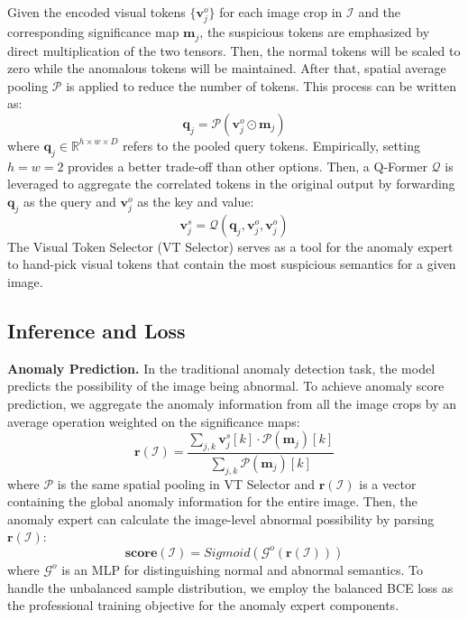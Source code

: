 Given the encoded visual tokens $\{\mathbf{v}^{o}_j\}$ for each image crop in $\mathcal{I}$ and the corresponding significance map $\textbf{m}_{j}$, the suspicious tokens are emphasized by direct multiplication of the two tensors. Then, the normal tokens will be scaled to zero while the anomalous tokens will be maintained. After that, spatial average pooling $\mathcal{P}$ is applied to reduce the number of tokens. This process can be written as:
\begin{equation}
    \textbf{q}_{j}=\mathcal{P}(\mathbf{v}^{o}_{j}\odot \textbf{m}_{j})
\end{equation}
where $\textbf{q}_{j}\in \mathbb{R}^{h \times w \times D}$ refers to the pooled query tokens. Empirically, setting $h=w=2$ provides a better trade-off than other options. Then, a Q-Former $\mathcal{Q}$ \cite{blip2} is leveraged to aggregate the correlated tokens in the original output by forwarding $\textbf{q}_{j}$ as the query and $\mathbf{v}^{o}_{j}$ as the key and value:
\begin{equation}
    \mathbf{v}^{s}_{j}=\mathcal{Q}(\textbf{q}_{j}, \mathbf{v}^{o}_{j}, \mathbf{v}^{o}_{j})
\end{equation}
The Visual Token Selector (VT Selector) serves as a tool for the anomaly expert to hand-pick visual tokens that contain the most suspicious semantics for a given image.

\subsection{Inference and Loss}
\noindent\textbf{Anomaly Prediction.} In the traditional anomaly detection task, the model predicts the possibility of the image being abnormal. To achieve anomaly score prediction, we aggregate the anomaly information from all the image crops by an average operation weighted on the significance maps:
\begin{equation}
    \mathbf{r}(\mathcal{I}) = \frac{\sum_{j, k} \mathbf{v}^{s}_{j}[k]\cdot \mathcal{P}(\textbf{m}_{j})[k]}{\sum_{j, k}\mathcal{P}(\textbf{m}_{j})[k]}
\end{equation}
where $\mathcal{P}$ is the same spatial pooling in VT Selector and $\mathbf{r}(\mathcal{I})$ is a vector containing the global anomaly information for the entire image. Then, the anomaly expert can calculate the image-level abnormal possibility by parsing $\mathbf{r}(\mathcal{I})$:
\begin{equation}
    \mathbf{score}(\mathcal{I})=Sigmoid(\mathcal{G}^{o}(\mathbf{r}(\mathcal{I})))
\end{equation}
where $\mathcal{G}^{o}$ is an MLP for distinguishing normal and abnormal semantics. To handle the unbalanced sample distribution, we employ the balanced BCE loss as the professional training objective for the anomaly expert components.

